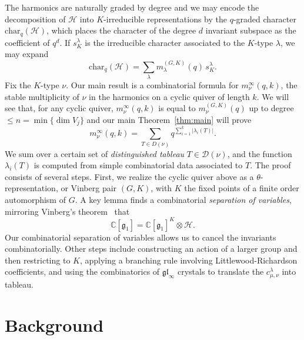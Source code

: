 \documentclass[ALCO,Unicode]{cedram}
\newcommand{\C}{\mathbb{C}}
\newcommand{\Ha}{\mathcal{H}}
\newcommand{\g}{\mathfrak{g}}
\newcommand{\gl}{\mathfrak{gl}}
\begin{document}
The harmonics are naturally graded by degree and we may encode the decomposition of $\Ha$ into $K$-irreducible representations by the $q$-graded character $\text{char}_q(\Ha)$, which places the character of the degree $d$ invariant subspace as the coefficient of $q^d$. If $s_K^\lambda$ is the irreducible character associated to the $K$-type $\lambda$, we may expand
\begin{equation*}
    \text{char}_q(\Ha) = \sum_\lambda m_\lambda^{(G,K)}(q) \, s_K^\lambda.
\end{equation*}
Fix the $K$-type $\nu$. Our main result is a combinatorial formula for $m_\nu^\infty(q,k)$, the stable multiplicity of $\nu$ in the harmonics on a cyclic quiver of length $k$. We will see that, for any cyclic quiver, $m_\nu^\infty(q,k)$ is equal to $m_\nu^{(G,K)}(q)$ up to degree $\leq n = \min \{ \dim V_j \}$ and our main Theorem~\ref{thm:main} will prove
$$m_\nu^\infty(q,k) = \sum_{T \in D(\nu)} q^{\sum_{i=1}^k |\lambda_i(T)|}.$$
We sum over a certain set of \textit{distinguished tableau} $T \in \mathcal{D}(\nu)$, and the function $\lambda_i(T)$ is computed from simple combinatorial data associated to $T$. The proof consists of several steps. First, we realize the cyclic quiver above as a $\theta$-representation, or Vinberg pair $(G,K)$, with $K$ the fixed points of a finite order automorphism of $G$. A key lemma finds a combinatorial \textit{separation of variables}, mirroring Vinberg's theorem~\cite{Vinberg1976} that
\begin{equation*}
    \C[\g_1] = \C[\g_1]^K \otimes \Ha.
\end{equation*}
Our combinatorial separation of variables allows us to cancel the invariants combinatorially. Other steps include constructing an action of a larger group and then restricting to $K$, applying a branching rule involving Littlewood-Richardson coefficients, and using the combinatorics of $\gl_\infty$ crystals to translate the $c^\lambda_{\mu,\nu}$ into tableau.

\section{Background}
\end{document}
